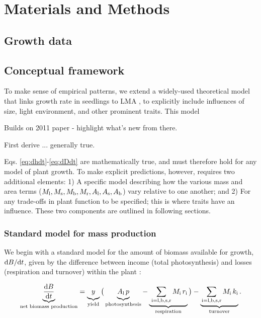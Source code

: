 \documentclass[a4paper,11pt]{article}
\begin{document}
\section{Materials and Methods}\label{materials-and-methods}

\subsection{Growth data}\label{growth-data}


\subsection{Conceptual framework}\label{conceptual-framework}

To make sense of empirical patterns, we extend a widely-used theoretical model that links growth rate in
seedlings to LMA \citep{Lambers-1992, Wright-2000}, to explicitly include influences of
size, light environment, and other prominent traits. This model

Builds on 2011 paper - highlight what's new from there.

First derive ... generally true.

Eqs. \ref{eq:dhdt}-\ref{eq:dDdt} are mathematically true, and must
therefore hold for any model of plant growth. To make explicit
predictions, however, requires two additional elements: 1) A specific
model describing how the various mass and area terms
($M_{\rm l}, M_\textrm{s}, M_{\rm b}, M_{\rm r}, A_{\rm l}, A_\textrm{s}, A_{\rm b}$)
vary relative to one another; and 2) For any trade-offs in plant
function to be specified; this is where traits have an influence.  These two components are outlined in following sections.

\subsubsection{Standard model for mass production}

We begin with a standard model for the amount of biomass available for
growth, ${\rm d}B / {\rm d}t$, given by the difference between income
(total photosynthesis) and losses (respiration and turnover) within the
plant \citep{Makela-1997, Thornley-2000, Falster-2011}:

\begin{equation}\label{eq:dbdt}
\underbrace{\strut \frac{{\rm d}B}{{\rm d}t}}_\textrm{net biomass production}
  = \underbrace{\strut y}_\textrm{yield}
    \big( \underbrace{\strut A_{\rm l} \, p}_\textrm{photosynthesis} -
     \underbrace{\strut \,\sum_\textrm{i=l,b,s,r}{M_\textrm{i} \, r_\textrm{i}}}_\textrm{respiration}\big)
    - \underbrace{\strut \sum_\textrm{i=l,b,s,r}{M_\textrm{i} \, k_\textrm{i}}}_\textrm{turnover}.
\end{equation}
\end{document}
